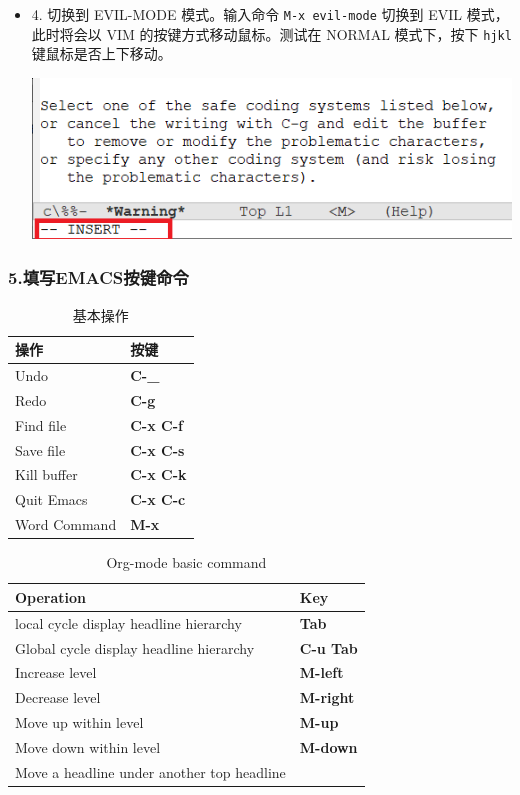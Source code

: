 \documentclass[UTF8]{ctexart}
\begin{document}
\begin{itemize}
\item 4. 切换到 EVIL-MODE 模式。输入命令 \texttt{M-x evil-mode} 切换到 EVIL 模式，此时将会以 VIM 的按键方式移动鼠标。测试在 NORMAL 模式下，按下 \texttt{hjkl} 键鼠标是否上下移动。
\label{sec:orgcf854e5}
\begin{center}
\includegraphics[width=.9\linewidth]{image/13.png}
\end{center}
\end{itemize}
\subsubsection*{5.填写EMACS按键命令}
\label{sec:orgd0ee403}
\begin{table}[htbp]
\caption{基本操作}
\centering
\begin{tabular}{ll}
操作 & 按键\\
\hline
Undo & \textbf{C-\_}\\
Redo & \textbf{C-g}\\
Find file & \textbf{C-x C-f}\\
Save file & \textbf{C-x C-s}\\
Kill buffer & \textbf{C-x C-k}\\
Quit Emacs & \textbf{C-x C-c}\\
Word Command & \textbf{M-x}\\
\end{tabular}
\end{table}

\begin{table}[htbp]
\caption{Org-mode basic command}
\centering
\begin{tabular}{ll}
Operation & Key\\
\hline
local cycle display headline hierarchy & \textbf{Tab}\\
Global cycle display headline hierarchy & \textbf{C-u Tab}\\
Increase level & \textbf{M-left}\\
Decrease level & \textbf{M-right}\\
Move up within level & \textbf{M-up}\\
Move down within level & \textbf{M-down}\\
Move a headline under another top headline & \\
\end{tabular}
\end{table}
\end{document}
